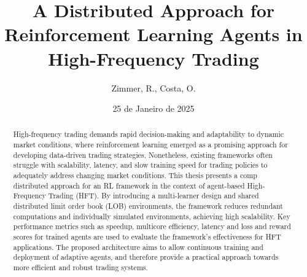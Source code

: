 \title{A Distributed Approach for Reinforcement Learning Agents in High-Frequency Trading}
\author{Zimmer, R., Costa, O.}
\date{25 de Janeiro de 2025}

\setlength{\droptitle}{-2cm}
\maketitle
\begin{abstract}
    High-frequency trading demands rapid decision-making and adaptability to dynamic market conditions, where
    reinforcement learning emerged as a promising approach for developing data-driven trading strategies.
    Nonetheless, existing frameworks often struggle with scalability, latency,
    and slow training speed for trading policies to adequately address changing market conditions.
    This thesis presents a comp distributed approach for an RL framework in the context of agent-based High-Frequency Trading (HFT).
    By introducing a multi-learner design and shared distributed limit order book (LOB) environments,
    the framework reduces redundant computations and individually simulated environments, achieving high scalability.
    Key performance metrics such as speedup, multicore efficiency, latency
    and loss and reward scores for trained agents are used to evaluate the framework's effectiveness for HFT applications.
    The proposed architecture aims to allow continuous training and deployment of adaptive agents,
    and therefore provide a practical approach towards more efficient and robust trading systems.
\end{abstract}


